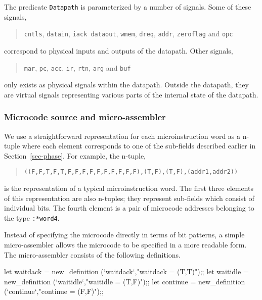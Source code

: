 The predicate \verb"Datapath" is parameterized by a number of signals.
Some of these signals,

\begin{quote}
\verb"cntls", \verb"datain", \verb"iack dataout", \verb"wmem",
\verb"dreq", \verb"addr", \verb"zeroflag" and \verb"opc"
\end{quote}

\noindent
correspond to physical inputs and outputs of the datapath.
Other signals,

\begin{quote}
\verb"mar", \verb"pc", \verb"acc", \verb"ir", \verb"rtn",
\verb"arg" and \verb"buf"
\end{quote}

\noindent
only exists as physical signals within the datapath.
Outside the datapath, they are virtual signals representing
various parts of the internal state of the datapath.

\subsubsection{Microcode source and micro-assembler}
\label{sec-microcode}

We use a straightforward representation for each microinstruction word
as a n-tuple where each element corresponds to one of the sub-fields
described earlier in Section~\ref{sec-phase}.
For example, the n-tuple,

\begin{quote}
\verb"((F,F,T,F,T,F,F,F,F,F,F,F,F,F,F),(T,F),(T,F),(addr1,addr2))"
\end{quote}

\noindent
is the representation of a typical microinstruction word.
The first three elements of this representation are also n-tuples;
they represent sub-fields which consist of individual bits.
The fourth element is a pair of microcode addresses
belonging to the type \verb":*word4".

\newpage %

Instead of specifying the microcode directly in terms of bit patterns,
a simple micro-assembler allows the microcode to be
specified in a more readable form.
The micro-assembler consists of the following definitions.

\begintt
let waitdack = new_definition (`waitdack`,"waitdack = (T,T)");;
let waitidle = new_definition (`waitidle`,"waitidle = (T,F)");;
let continue = new_definition (`continue`,"continue = (F,F)");;

